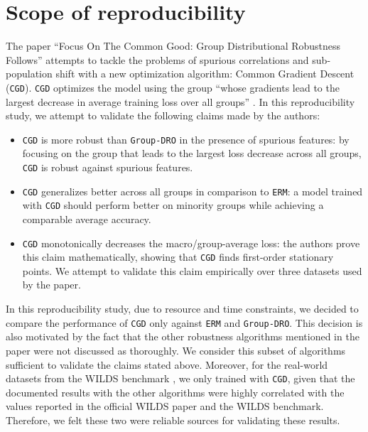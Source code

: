 \section{Scope of reproducibility}
\label{sec:claims}

The paper ``Focus On The Common Good: Group Distributional Robustness Follows'' \cite{piratla2022focus} attempts to tackle the problems of spurious correlations and sub-population shift with a new optimization algorithm: Common Gradient Descent (\texttt{CGD}). \texttt{CGD} optimizes the model using the group ``whose gradients lead to the largest decrease in average training loss over all groups'' \cite{piratla2022focus}. In this reproducibility study, we attempt to validate the following claims made by the authors:


\begin{itemize}
    \item \texttt{CGD} is more robust than \texttt{Group-DRO} in the presence of spurious features: by focusing on the group that leads to the largest loss decrease across all groups, \texttt{CGD} is robust against spurious features.
    \item \texttt{CGD} generalizes better across all groups in comparison to \texttt{ERM}: a model trained with \texttt{CGD} should perform better on minority groups while achieving a comparable average accuracy.
    \item \texttt{CGD} monotonically decreases the macro/group-average loss: the authors prove this claim mathematically, showing that \texttt{CGD} finds first-order stationary points. We attempt to validate this claim empirically over three datasets used by the paper.
\end{itemize}

In this reproducibility study, due to resource and time constraints, we decided to compare the performance of \texttt{CGD} only against \texttt{ERM} and \texttt{Group-DRO}. This decision is also motivated by the fact that the other robustness algorithms mentioned in the paper were not discussed as thoroughly. We consider this subset of algorithms sufficient to validate the claims stated above. Moreover, for the real-world datasets from the WILDS benchmark \cite{koh2021wilds}, we only trained with \texttt{CGD}, given that the documented results with the other algorithms were highly correlated with the values reported in the official WILDS paper \cite{koh2021wilds} and the WILDS benchmark. Therefore, we felt these two were reliable sources for validating these results.


